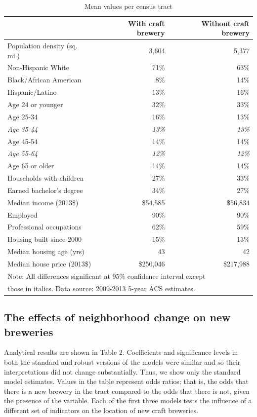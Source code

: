 \documentclass[]{article}
\begin{document}
\begin{longtable}[c]{@{}lrr@{}}
\caption{Mean values per census tract}\\
\toprule
& With craft brewery & Without craft brewery\tabularnewline
\midrule
\endhead
Population density (sq. mi.) & 3,604 & 5,377\tabularnewline
Non-Hispanic White & 71\% & 63\%\tabularnewline
Black/African American & 8\% & 14\%\tabularnewline
Hispanic/Latino & 13\% & 16\%\tabularnewline
Age 24 or younger & 32\% & 33\%\tabularnewline
Age 25-34 & 16\% & 13\%\tabularnewline
\emph{Age 35-44} & \emph{13\%} & \emph{13\%}\tabularnewline
Age 45-54 & 14\% & 14\%\tabularnewline
\emph{Age 55-64} & \emph{12\%} & \emph{12\%}\tabularnewline
Age 65 or older & 14\% & 14\%\tabularnewline
Households with children & 27\% & 33\%\tabularnewline
Earned bachelor's degree & 34\% & 27\%\tabularnewline
Median income (2013\$) & \$54,585 & \$56,834\tabularnewline
Employed & 90\% & 90\%\tabularnewline
Professional occupations & 62\% & 59\%\tabularnewline
Housing built since 2000 & 15\% & 13\%\tabularnewline
Median housing age (yrs) & 43 & 42\tabularnewline
Median house price (2013\$) & \$250,046 & \$217,988\tabularnewline
\bottomrule
\multicolumn{3}{l}{Note: All differences significant at 95\% confidence interval except} \\
\multicolumn{3}{l}{those in italics. Data source: 2009-2013 5-year ACS estimates.}
\end{longtable}

\subsection{The effects of neighborhood change on new
breweries}\label{the-effects-of-neighborhood-change-on-new-breweries}

Analytical results are shown in Table 2. Coefficients and significance
levels in both the standard and robust versions of the models were
similar and so their interpretations did not change substantially. Thus,
we show only the standard model estimates. Values in the table represent
odds ratios; that is, the odds that there is a new brewery in the tract
compared to the odds that there is not, given the presence of the
variable. Each of the first three models tests the influence of a
different set of indicators on the location of new craft breweries.
\end{document}

